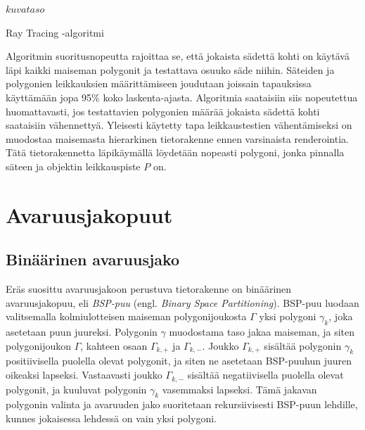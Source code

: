 \documentclass[a4paper,12pt, titlepage]{article}
\theoremstyle{break}
\begin{document}
\newpage
\begin{algorithm}
\KwRet $kuvataso$
\caption{Ray Tracing -algoritmi}\label{algo_raytrace}
\end{algorithm}

Algoritmin suoritusnopeutta rajoittaa se, että jokaista sädettä kohti on käytävä läpi kaikki maiseman polygonit ja testattava osuuko säde niihin. Säteiden ja polygonien leikkauksien määrittämiseen joudutaan joissain tapauksissa käyttämään jopa 95\% koko laskenta-ajasta.\cite{whitted} Algoritmia saataisiin siis nopeutettua huomattavasti, jos testattavien polygonien määrää jokaista sädettä kohti saataisiin vähennettyä. Yleisesti käytetty tapa leikkaustestien vähentämiseksi on muodostaa maisemasta hierarkinen tietorakenne ennen varsinaista renderointia. Tätä tietorakennetta läpikäymällä löydetään nopeasti polygoni, jonka pinnalla säteen ja objektin leikkauspiste $P$ on.\cite{rubin}


\newpage
\section{Avaruusjakopuut}
\subsection{Binäärinen avaruusjako}

Eräs suosittu avaruusjakoon perustuva tietorakenne on binäärinen avaruusjakopuu, eli \emph{BSP-puu} (engl. \emph{Binary Space Partitioning}). BSP-puu luodaan valitsemalla kolmiulotteisen maiseman  polygonijoukosta $\Gamma$ yksi polygoni $\gamma_k$, joka asetetaan puun juureksi. Polygonin $\gamma$ muodostama taso jakaa maiseman, ja siten polygonijoukon $\Gamma$, kahteen osaan $\Gamma_{k,+}$ ja $\Gamma_{k,-}$. Joukko $\Gamma_{k,+}$ sisältää polygonin $\gamma_k$ positiivisella puolella olevat polygonit, ja siten ne asetetaan BSP-puuhun juuren oikeaksi lapseksi. Vastaavasti joukko $\Gamma_{k,-}$ sisältää negatiivisella puolella olevat polygonit, ja kuuluvat polygonin $\gamma_k$ vasemmaksi lapseksi. Tämä jakavan polygonin valinta ja avaruuden jako suoritetaan rekursiivisesti BSP-puun lehdille, kunnes jokaisessa lehdessä on vain yksi polygoni.\cite{samet}\\
\end{document}
